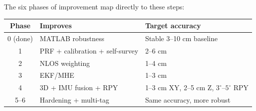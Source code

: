 \documentclass[11pt,a4paper]{article}
\begin{document}
\bigskip
The six phases of improvement map directly to these steps:

\begin{center}
\begin{tabular}{cll}
\toprule
\textbf{Phase} & \textbf{Improves} & \textbf{Target accuracy} \\
\midrule
0 (done) & MATLAB robustness & Stable 3--10 cm baseline \\
1 & PRF + calibration + self-survey & 2--6 cm \\
2 & NLOS weighting & 1--4 cm \\
3 & EKF/MHE & 1--3 cm \\
4 & 3D + IMU fusion + RPY & 1--3 cm XY, 2--5 cm Z, $3^\circ$--$5^\circ$ RPY \\
5--6 & Hardening + multi-tag & Same accuracy, more robust \\
\bottomrule
\end{tabular}
\end{center}
\end{document}
